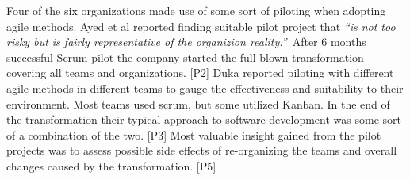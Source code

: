 Four of the six organizations made use of some sort of piloting when
adopting agile methods. Ayed et al reported finding suitable pilot
project that \textit{``is not too risky but is fairly representative
of the organizion reality.''} After 6 months successful Scrum pilot
the company started the full blown transformation covering all teams
and organizations. [P2] Duka reported piloting with different agile
methods in different teams to gauge the effectiveness and suitability
to their environment. Most teams used scrum, but some utilized Kanban.
In the end of the transformation their typical approach to software
development was some sort of a combination of the two. [P3] Most
valuable insight gained from the pilot projects was to assess possible
side effects of re-organizing the teams and overall changes caused by
the transformation. [P5]
